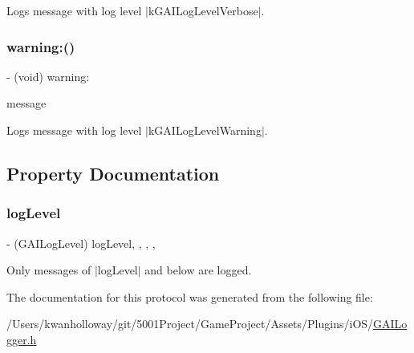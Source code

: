 Logs message with log level $\vert$k\+G\+A\+I\+Log\+Level\+Verbose$\vert$. \mbox{\label{protocol_g_a_i_logger-p_a47771f0b70be428422ea58950f3cc506}} 
\subsubsection{\texorpdfstring{warning\+:()}{warning:()}}
{\footnotesize\ttfamily -\/ (void) warning\+: \begin{DoxyParamCaption}\item[{(N\+S\+String $\ast$)}]{message }\end{DoxyParamCaption}}

Logs message with log level $\vert$k\+G\+A\+I\+Log\+Level\+Warning$\vert$. 

\subsection{Property Documentation}
\mbox{\label{protocol_g_a_i_logger-p_a42c0b17d9224b8a9b02281a3537cded4}} 
\subsubsection{\texorpdfstring{log\+Level}{logLevel}}
{\footnotesize\ttfamily -\/ (G\+A\+I\+Log\+Level) log\+Level\hspace{0.3cm}{\ttfamily [read]}, {\ttfamily [write]}, {\ttfamily [required]}, {\ttfamily [nonatomic]}, {\ttfamily [assign]}}

Only messages of $\vert$log\+Level$\vert$ and below are logged. 

The documentation for this protocol was generated from the following file\+:\begin{DoxyCompactItemize}
\item 
/\+Users/kwanholloway/git/5001\+Project/\+Game\+Project/\+Assets/\+Plugins/i\+O\+S/\hyperlink{_g_a_i_logger_8h}{G\+A\+I\+Logger.\+h}\end{DoxyCompactItemize}
